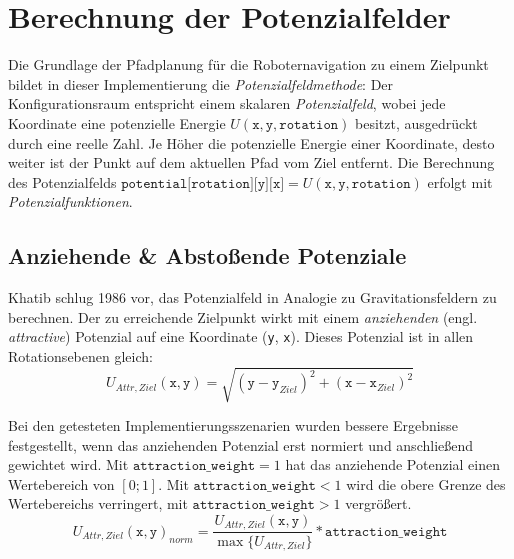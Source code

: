 \chapter{Berechnung der Potenzialfelder}

Die Grundlage der Pfadplanung für die Roboternavigation zu einem Zielpunkt bildet in dieser Implementierung die \textit{Potenzialfeldmethode}:
Der Konfigurationsraum entspricht einem skalaren \textit{Potenzialfeld}, wobei jede Koordinate eine potenzielle Energie $U(\texttt{x}, \texttt{y}, \texttt{rotation})$ besitzt, ausgedrückt durch eine reelle Zahl.
Je Höher die potenzielle Energie einer Koordinate, desto weiter ist der Punkt auf dem aktuellen Pfad vom Ziel entfernt.
Die Berechnung des Potenzialfelds $\texttt{potential[rotation][y][x]} = U(\texttt{x}, \texttt{y}, \texttt{rotation})$ erfolgt mit \textit{Potenzialfunktionen}. \cite{yujiang.2017}

\section{Anziehende \& Abstoßende Potenziale}

Khatib schlug 1986 vor, das Potenzialfeld in Analogie zu Gravitationsfeldern zu berechnen. Der zu erreichende Zielpunkt wirkt mit einem \textit{anziehenden} (engl. \textit{attractive}) Potenzial auf eine Koordinate (\texttt{y}, \texttt{x}). \cite{khatib.1985} Dieses Potenzial ist in allen Rotationsebenen gleich:
\vspace*{0.2cm}
\begin{equation*}
U_{Attr, Ziel}(\texttt{x}, \texttt{y}) = \sqrt{(\texttt{y} - \texttt{y}_{Ziel})^2 + (\texttt{x} - \texttt{x}_{Ziel})^2}
\end{equation*}

\vspace*{-0.1cm}
Bei den getesteten Implementierungsszenarien wurden bessere Ergebnisse festgestellt, wenn das anziehenden Potenzial erst normiert und anschließend gewichtet wird. Mit $\texttt{attraction\_weight} = 1$ hat das anziehende Potenzial einen Wertebereich von $[0;1]$. Mit  $\texttt{attraction\_weight} < 1$ wird die obere Grenze des Wertebereichs verringert, mit $\texttt{attraction\_weight} > 1$ vergrößert.
\vspace*{0.2cm}
\begin{equation*}
U_{Attr, Ziel}(\texttt{x}, \texttt{y})_{norm} = \frac{U_{Attr, Ziel}(\texttt{x}, \texttt{y})}{\max \{ U_{Attr, Ziel}\}} * \texttt{attraction\_weight} 
\end{equation*}

